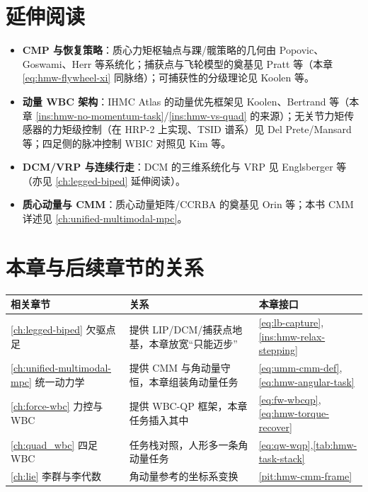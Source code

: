 \section*{延伸阅读}
\begin{itemize}
  \item \textbf{CMP 与恢复策略}：质心力矩枢轴点与踝/髋策略的几何由 Popovic、Goswami、Herr 等系统化\cite{popovic2005cmp}；捕获点与飞轮模型的奠基见 Pratt 等\cite{pratt2006capture}（本章 \cref{eq:hmw-flywheel-xi} 同脉络）；可捕获性的分级理论见 Koolen 等\cite{koolen2012capturability}。
  \item \textbf{动量 WBC 架构}：IHMC Atlas 的动量优先框架见 Koolen、Bertrand 等\cite{koolen2016atlas}（本章 \cref{ins:hmw-no-momentum-task}/\cref{ins:hmw-vs-quad} 的来源）；无关节力矩传感器的力矩级控制（在 HRP-2 上实现、TSID 谱系）见 Del Prete/Mansard 等\cite{delprete2016tsid}；四足侧的脉冲控制 WBIC 对照见 Kim 等\cite{kim2019wbic}。
  \item \textbf{DCM/VRP 与连续行走}：DCM 的三维系统化与 VRP 见 Englsberger 等\cite{englsberger2015dcm}（亦见 \cref{ch:legged-biped} 延伸阅读）。
  \item \textbf{质心动量与 CMM}：质心动量矩阵/CCRBA 的奠基见 Orin 等\cite{orin2013centroidal}；本书 CMM 详述见 \cref{ch:unified-multimodal-mpc}。
\end{itemize}

\section*{本章与后续章节的关系}
\begin{table}[H]\centering\small
\begin{tabular}{lll}
\toprule
相关章节 & 关系 & 本章接口 \\
\midrule
\cref{ch:legged-biped} 欠驱点足 & 提供 LIP/DCM/捕获点地基，本章放宽“只能迈步” & \cref{eq:lb-capture},\cref{ins:hmw-relax-stepping} \\
\cref{ch:unified-multimodal-mpc} 统一动力学 & 提供 CMM 与角动量守恒，本章组装角动量任务 & \cref{eq:umm-cmm-def},\cref{eq:hmw-angular-task} \\
\cref{ch:force-wbc} 力控与 WBC & 提供 WBC-QP 框架，本章任务插入其中 & \cref{eq:fw-wbcqp},\cref{eq:hmw-torque-recover} \\
\cref{ch:quad_wbc} 四足 WBC & 任务栈对照，人形多一条角动量任务 & \cref{eq:qw-wqp},\cref{tab:hmw-task-stack} \\
\cref{ch:lie} 李群与李代数 & 角动量参考的坐标系变换 & \cref{pit:hmw-cmm-frame} \\
\bottomrule
\end{tabular}
\end{table}

